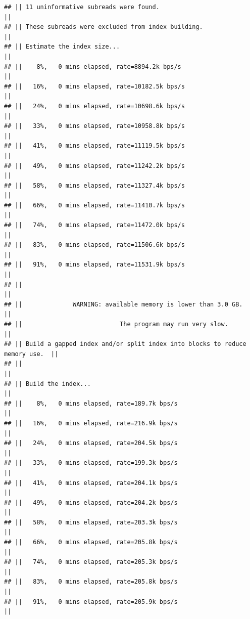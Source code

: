 \documentclass[
]{book}
\begin{document}
\begin{verbatim}
## || 11 uninformative subreads were found.                                      ||
## || These subreads were excluded from index building.                          ||
## || Estimate the index size...                                                 ||
## ||    8%,   0 mins elapsed, rate=8894.2k bps/s                                ||
## ||   16%,   0 mins elapsed, rate=10182.5k bps/s                               ||
## ||   24%,   0 mins elapsed, rate=10698.6k bps/s                               ||
## ||   33%,   0 mins elapsed, rate=10958.8k bps/s                               ||
## ||   41%,   0 mins elapsed, rate=11119.5k bps/s                               ||
## ||   49%,   0 mins elapsed, rate=11242.2k bps/s                               ||
## ||   58%,   0 mins elapsed, rate=11327.4k bps/s                               ||
## ||   66%,   0 mins elapsed, rate=11410.7k bps/s                               ||
## ||   74%,   0 mins elapsed, rate=11472.0k bps/s                               ||
## ||   83%,   0 mins elapsed, rate=11506.6k bps/s                               ||
## ||   91%,   0 mins elapsed, rate=11531.9k bps/s                               ||
## ||                                                                            ||
## ||              WARNING: available memory is lower than 3.0 GB.               ||
## ||                           The program may run very slow.                   ||
## || Build a gapped index and/or split index into blocks to reduce memory use.  ||
## ||                                                                            ||
## || Build the index...                                                         ||
## ||    8%,   0 mins elapsed, rate=189.7k bps/s                                 ||
## ||   16%,   0 mins elapsed, rate=216.9k bps/s                                 ||
## ||   24%,   0 mins elapsed, rate=204.5k bps/s                                 ||
## ||   33%,   0 mins elapsed, rate=199.3k bps/s                                 ||
## ||   41%,   0 mins elapsed, rate=204.1k bps/s                                 ||
## ||   49%,   0 mins elapsed, rate=204.2k bps/s                                 ||
## ||   58%,   0 mins elapsed, rate=203.3k bps/s                                 ||
## ||   66%,   0 mins elapsed, rate=205.8k bps/s                                 ||
## ||   74%,   0 mins elapsed, rate=205.3k bps/s                                 ||
## ||   83%,   0 mins elapsed, rate=205.8k bps/s                                 ||
## ||   91%,   0 mins elapsed, rate=205.9k bps/s                                 ||

\end{verbatim}
\end{document}
